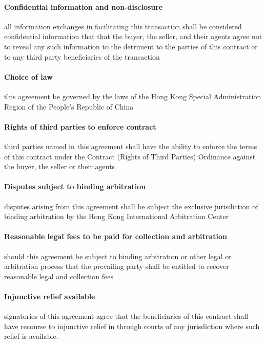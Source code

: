 \documentclass[10pt]{article}
\begin{document}
\paragraph{Confidential information and non-disclosure} all
information exchanges in facilitating this transaction shall be
considered confidential information that that the buyer, the seller,
and their agents agree not to reveal any such information to the
detriment to the parties of this contract or to any third party
beneficiaries of the transaction

\paragraph{Choice of law} this agreement be governed by the laws of the Hong Kong Special Administration Region of the People’s Republic of China


\paragraph{Rights of third parties to enforce contract} third parties named in this agreement shall have the ability to enforce the terms of this contract under the Contract (Rights of Third Parties) Ordinance against the buyer, the seller or their agents

\paragraph{Disputes subject to binding arbitration} disputes arising from this agreement shall be subject the exclusive
jurisdiction of binding arbitration by the Hong Kong International
Arbitration Center

\paragraph{Reasonable legal fees to be paid for collection and
  arbitration} should this agreement be subject to binding arbitration
or other legal or arbitration process that the prevailing party shall
be entitled to recover reasonable legal and collection fees

\paragraph{Injunctive relief available} signatories of this agreement agree that the beneficiaries of this contract shall have recourse to injunctive relief in through courts of any jurisdiction where such relief is available.
\end{document}
